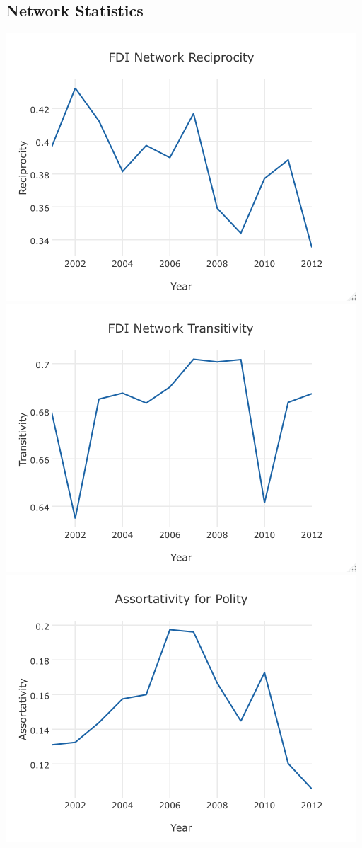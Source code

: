 \documentclass{article}
\begin{document}
\subsection{Network Statistics}

\includegraphics[scale=.8]{draft_figures/reciprocity.png}\\
\includegraphics[scale=.8]{draft_figures/transitivity.png}\\
\includegraphics[scale=.8]{draft_figures/assortativity.png}\\
\end{document}
